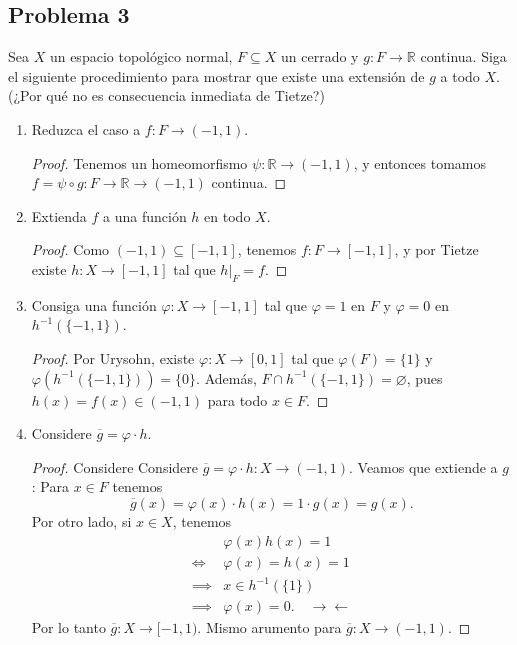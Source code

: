\documentclass{article}
\theoremstyle{definition}
\theoremstyle{remark}
\numberwithin{equation}{section}
\newcommand{\R}{\mathbb{R}}
\newcommand{\vphi}{\varphi}
\renewcommand{\bar}{\overline}
\renewcommand{\o}{\to}
\begin{document}
\newpage
\subsection{Problema 3}
Sea $X$ un espacio topológico normal, $F \subseteq X$ un cerrado y $g \colon F \to \R$ continua. Siga el siguiente procedimiento para mostrar que existe una extensión de $g$ a todo $X$. (¿Por qué no es consecuencia inmediata de Tietze?)
\begin{enumerate}
\item Reduzca el caso a $f \colon F \to (-1,1)$.
\begin{proof}
  Tenemos un homeomorfismo $\psi \colon \R \to (-1,1)$, y entonces tomamos $f = \psi \circ g \colon F \to \R \to (-1,1)$ continua.
\end{proof}

\item Extienda $f$ a una función $h$ en todo $X$.
\begin{proof}
  Como $(-1,1) \subseteq [-1,1]$, tenemos $f \colon F \to [-1,1]$, y por Tietze existe $h \colon X \to [-1,1]$ tal que $h\vert_F = f$.
\end{proof}

\item Consiga una función $\vphi \colon X \o [-1,1]$ tal que $\vphi = 1$ en $F$ y $\vphi = 0$ en $h^{-1}(\{-1,1\})$.
\begin{proof}
  Por Urysohn, existe $\vphi \colon X \to [0,1]$ tal que $\vphi(F) = \{1\}$ y $\vphi(h^{-1}(\{-1,1\})) = \{0\}$.
  Además, $F \cap h^{-1}(\{-1,1\}) = \varnothing$, pues $h(x) = f(x) \in (-1,1)$ para todo $x \in F$.
\end{proof}

\item Considere $\bar g = \vphi \cdot h$.
\begin{proof}
  Considere Considere $\bar g = \varphi \cdot h \colon X \to (-1,1)$. Veamos que extiende a $g$: Para $x \in F$ tenemos
  \[\bar g(x) = \vphi(x) \cdot h(x) = 1 \cdot g(x) = g(x).\]
  Por otro lado, si $x \in X$, tenemos
  \begin{align*}
    &\vphi(x) h(x) = 1 \\
    \iff &\vphi(x) = h(x) = 1 \\
    \implies &x \in h^{-1}(\{1\}) \\
    \implies &\vphi(x) = 0. \quad \to\gets
  \end{align*}
  Por lo tanto $\bar g \colon X \to [-1,1)$. Mismo arumento para $\bar g \colon X \to (-1,1)$.
\end{proof}
\end{enumerate}
\end{document}
